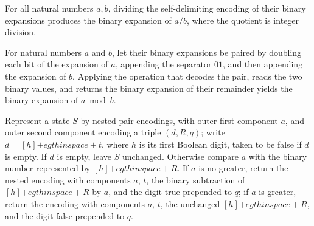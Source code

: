 \begin{theorem}
\label{Complexity.BinArith.div_pairEncode}
\leanok
{}
For all natural numbers $a,b$, dividing the self-delimiting encoding of their binary
expansions produces the binary expansion of $a/b$, where the quotient is integer
division.
\end{theorem}

\begin{theorem}
\label{Complexity.BinArith.mod_pairEncode}
\leanok
{}
For natural numbers $a$ and $b$, let their binary expansions be paired by doubling each
bit of the expansion of $a$, appending the separator $01$, and then appending the
expansion of $b$. Applying the operation that decodes the pair, reads the two binary
values, and returns the binary expansion of their remainder yields the binary expansion
of $a \bmod b$.
\end{theorem}

\begin{definition}
\label{Complexity.BinArith.divStep}
\leanok
{}
Represent a state $S$ by nested pair encodings, with outer first component $a$, and
outer second component encoding a triple $(d,R,q)$; write $d=[h]\mathbin{+
egthinspace+}t$, where $h$ is its first Boolean digit, taken to be false if $d$ is
empty. If $d$ is empty, leave $S$ unchanged. Otherwise compare $a$ with the binary
number represented by $[h]\mathbin{+
egthinspace+}R$. If $a$ is no greater, return the nested encoding with components $a$,
$t$, the binary subtraction of $[h]\mathbin{+
egthinspace+}R$ by $a$, and the digit true prepended to $q$; if $a$ is greater, return
the encoding with components $a$, $t$, the unchanged $[h]\mathbin{+
egthinspace+}R$, and the digit false prepended to $q$.
\end{definition}

